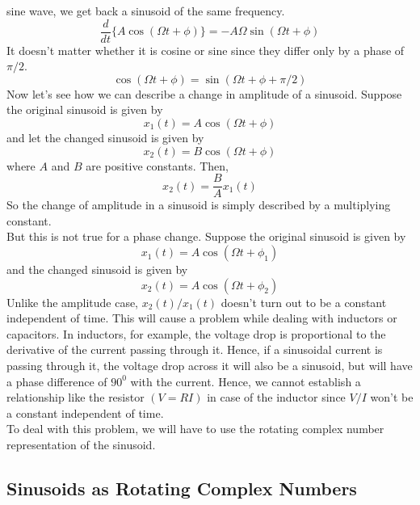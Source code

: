 sine wave, we get back a sinusoid of the same frequency.
\begin{equation*}
\frac{d}{d t}  \{ A \cos (\Omega t + \phi) \} = - A \Omega \sin
   (\Omega t + \phi)
\end{equation*}
It doesn't matter whether it is cosine or sine since they differ only by a
phase of $\pi / 2$.
\[ \cos (\Omega t + \phi) = \sin (\Omega t + \phi + \pi / 2) \]
Now let's see how we can describe a change in amplitude of a sinusoid.
Suppose the original sinusoid is given by
\[ x_1 (t) = A \cos (\Omega t + \phi) \]
and let the changed sinusoid is given by
\[ x_2 (t) = B \cos (\Omega t + \phi) \]
where $A$ and $B$ are positive constants. Then,
\[ x_2 (t) = \frac{B}{A} x_1 (t) \]
So the change of amplitude in a sinusoid is simply described by a multiplying
constant.\\
But this is not true for a phase change. Suppose the original sinusoid is
given by
\[ x_1 (t) = A \cos (\Omega t + \phi_1) \]
and the changed sinusoid is given by
\[ x_2 (t) = A \cos (\Omega t + \phi_2) \]
Unlike the amplitude case, $x_2 (t) / x_1 (t)$ doesn't turn out to be a
constant independent of time. This will cause a problem while dealing with
inductors or capacitors. In inductors, for example, the voltage drop is
proportional to the derivative of the current passing through it. Hence, if a
sinusoidal current is passing through it, the voltage drop across it will also
be a sinusoid, but will have a phase difference of $90^0$ with the current.
Hence, we cannot establish a relationship like the resistor $(V = RI)$ in case
of the inductor since $V / I$ won't be a constant independent of time.\\
To deal with this problem, we will have to use the rotating complex number
representation of the sinusoid.

\subsection{Sinusoids as Rotating Complex Numbers}

